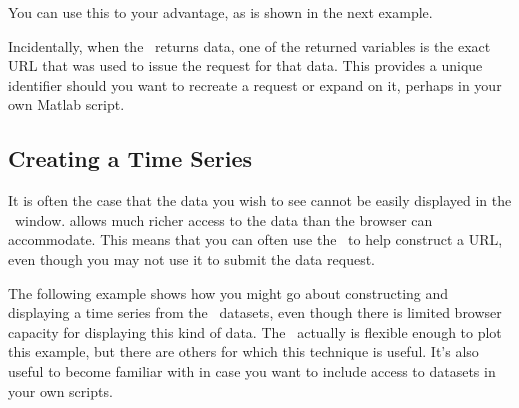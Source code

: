 You can use this to your advantage, as is shown in the next example.

Incidentally, when the \GUI\ returns data, one of the returned
variables is the exact URL that was used to issue the request for that
data.  This provides a unique identifier should you want to recreate a
request or expand on it, perhaps in your own Matlab script.


\subsection{Creating a Time Series}
\label{gui,intro,example-time}

It is often the case that the data you wish to see cannot be easily
displayed in the \GUI\ window. \opendap allows much richer access to the
data than the browser can accommodate. This means that you can often
use the \GUI\ to help construct a URL, even though you may not use it
to submit the data request.

The following example shows how you might go about constructing and
displaying a time series from the \GUI\ datasets, even though there is
limited browser capacity for displaying this kind of data.  The \GUI\
actually is flexible enough to plot this example, but there are others
for which this technique is useful.  It's also useful to become
familiar with  in case you want to include access to
\opendap datasets in your own scripts.

